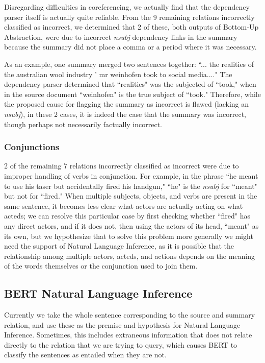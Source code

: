 \documentclass{article}
\begin{document}
Disregarding difficulties in coreferencing, we actually find that the dependency parser itself is actually quite reliable. From the 9 remaining relations incorrectly classified as incorrect, we determined that 2 of these, both outputs of Bottom-Up Abstraction, were due to incorrect \textit{nsubj} dependency links in the summary because the summary did not place a comma or a period where it was necessary.

As an example, one summary merged two sentences together: ``... the realities of the australian wool industry ' mr weinhofen took to social media...." The dependency parser determined that ``realities" was the subjected of ``took," when in the source document ``weinhofen" is the true subject of ``took."  Therefore, while the proposed cause for flagging the summary as incorrect is flawed (lacking an \textit{nsubj}), in these 2 cases, it is indeed the case that the summary was incorrect, though perhaps not necessarily factually incorrect.

\subsubsection{Conjunctions}

2 of the remaining 7 relations incorrectly classified as incorrect were due to improper handling of verbs in conjunction. For example, in the phrase ``he meant to use his taser but accidentally fired his handgun," ``he" is the \textit{nsubj} for ``meant" but not for ``fired." When multiple subjects, objects, and verbs are present in the same sentence, it becomes less clear what actors are actually acting on what acteds; we can resolve this particular case by first checking whether ``fired" has any direct actors, and if it does not, then using the actors of its head, ``meant" as its own, but we hypothesize that to solve this problem more generally we might need the support of Natural Language Inference, as it is possible that the relationship among multiple actors, acteds, and actions depends on the meaning of the words themselves or the conjunction used to join them.

\subsection{BERT Natural Language Inference}

Currently we take the whole sentence corresponding to the source and summary relation, and use these as the premise and hypothesis for Natural Language Inference. Sometimes, this includes extraneous information that does not relate directly to the relation that we are trying to query, which causes BERT to classify the sentences as entailed when they are not.
\end{document}
